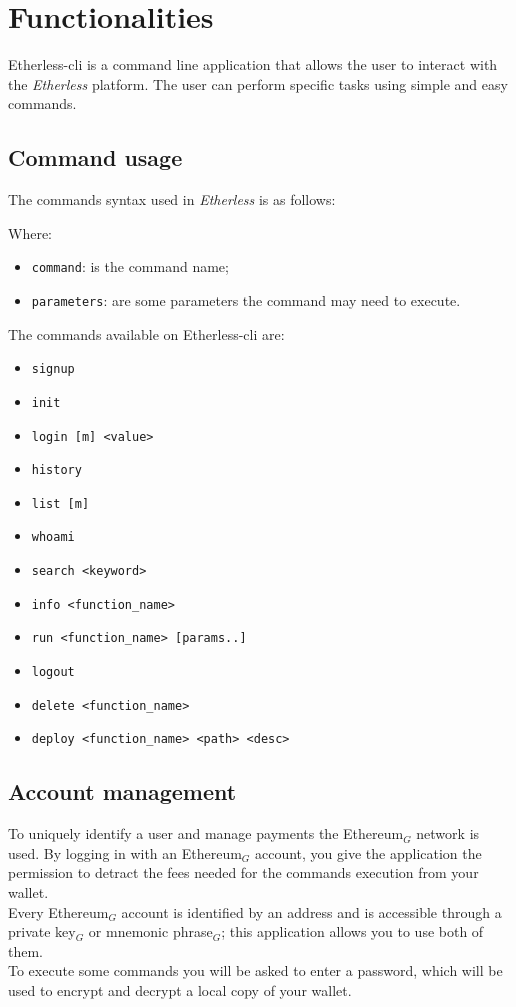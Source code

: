 \section{Functionalities}
Etherless-cli is a command line application that allows the user to interact with the \textit{Etherless} platform. The user can perform specific tasks using simple and easy commands.

\subsection{Command usage}
The commands syntax used in \textit{Etherless} is as follows:
\begin{center}
\end{center}
Where:
\begin{itemize}
	\item \texttt{command}: is the command name;
	\item \texttt{parameters}: are some parameters the command may need to execute.
\end{itemize}

\noindent The commands available on Etherless-cli are:
\begin{itemize}
	\item \texttt{signup}
	\item \texttt{init}
	\item \texttt{login [m] <value>}
	\item \texttt{history}
	\item \texttt{list [m]}
	\item \texttt{whoami}
	\item \texttt{search <keyword>}
	\item \texttt{info <function\_name>}
	\item \texttt{run <function\_name> [params..]}
	\item \texttt{logout}
	\item \texttt{delete <function\_name>}
	\item \texttt{deploy <function\_name> <path> <desc>}
\end{itemize}

\subsection{Account management}
To uniquely identify a user and manage payments the Ethereum$_{G}$ network is used. By logging in with an Ethereum$_{G}$ account, you give the application the permission to detract the fees needed for the commands execution from your wallet. \\
Every Ethereum$_{G}$ account is identified by an address and is accessible through a private key$_{G}$ or mnemonic phrase$_{G}$; this application allows you to use both of them. \\
To execute some commands you will be asked to enter a password, which will be used to encrypt and decrypt a local copy of your wallet.

